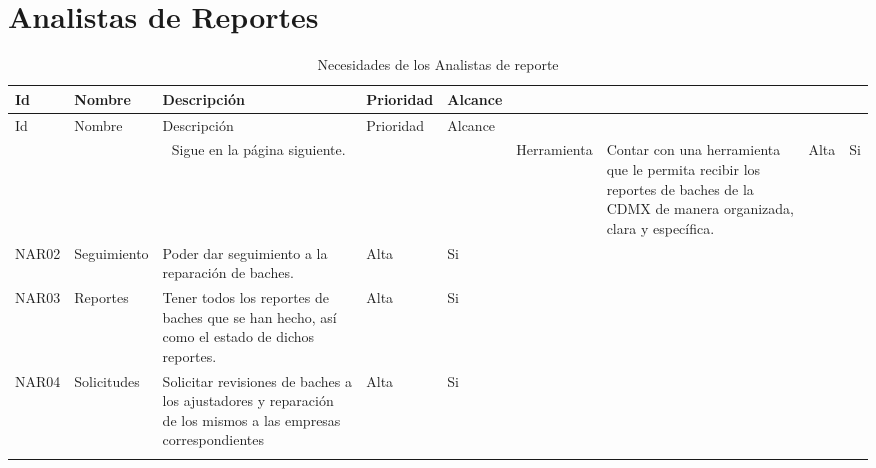 \section {Analistas de Reportes}
\begin{longtable}{|m{1.5cm}|m{3cm}|m{5cm}|m{2cm}| m{2cm}|}
        \rowcolor[HTML]{3531FF} 
        {\color[HTML]{FFFFFF} Id} &{\color[HTML]{FFFFFF}Nombre} & {\color[HTML]{FFFFFF} Descripción} & {\color[HTML]{FFFFFF}Prioridad} & {\color[HTML]{FFFFFF}Alcance}  \\
        \hline
        \endfirsthead
        \hline
        Id & Nombre & Descripción & Prioridad & Alcance  \\
        \hline 
        \endhead
        \multicolumn{5}{c}{Sigue en la página siguiente.}
        \endfoot
        \endlastfoot
        NAR01 & Herramienta & Contar con una herramienta que le permita recibir los reportes de baches de la CDMX de manera organizada, clara y específica. & Alta  & Si \\ \hline
        
        NAR02 & Seguimiento & Poder dar seguimiento a la reparación de baches. & Alta  & Si \\ \hline
        
        NAR03 & Reportes & Tener todos los reportes de baches que se han hecho, así como el estado de dichos reportes. & Alta  & Si \\ \hline
        
        NAR04 & Solicitudes & Solicitar revisiones de baches a los ajustadores y reparación de los mismos a las empresas correspondientes & Alta  & Si \\ \hline
        
    \caption{Necesidades de los Analistas de reporte}
    \label{tab:NARs}
\end{longtable}

\vspace{3cm}


